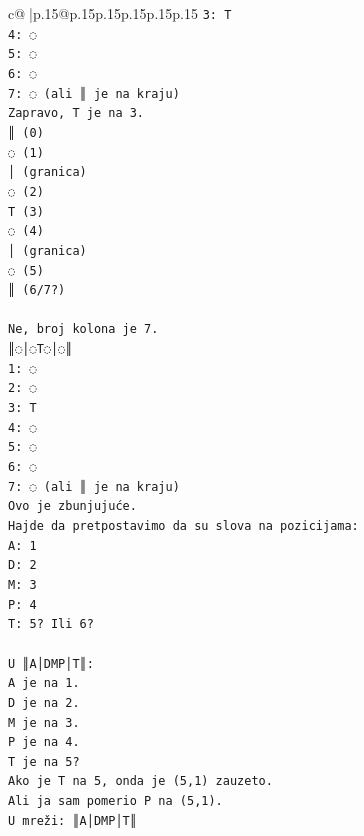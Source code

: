\documentclass{article}
\begin{document}
{\begin{supertabular}{c@{$\;$}|p{.15\linewidth}@{}p{.15\linewidth}p{.15\linewidth}p{.15\linewidth}p{.15\linewidth}p{.15\linewidth}}
{{{\texttt{3: T} \\
\texttt{4: ◌} \\
\texttt{5: ◌} \\
\texttt{6: ◌} \\
\texttt{7: ◌ (ali ║ je na kraju)} \\
\texttt{Zapravo, T je na 3.} \\
\texttt{║ (0)} \\
\texttt{◌ (1)} \\
\texttt{│ (granica)} \\
\texttt{◌ (2)} \\
\texttt{T (3)} \\
\texttt{◌ (4)} \\
\texttt{│ (granica)} \\
\texttt{◌ (5)} \\
\texttt{║ (6/7?)} \\
\\ 
\texttt{Ne, broj kolona je 7.} \\
\texttt{║◌│◌T◌│◌║} \\
\texttt{1: ◌} \\
\texttt{2: ◌} \\
\texttt{3: T} \\
\texttt{4: ◌} \\
\texttt{5: ◌} \\
\texttt{6: ◌} \\
\texttt{7: ◌ (ali ║ je na kraju)} \\
\texttt{Ovo je zbunjujuće.} \\
\texttt{Hajde da pretpostavimo da su slova na pozicijama:} \\
\texttt{A: 1} \\
\texttt{D: 2} \\
\texttt{M: 3} \\
\texttt{P: 4} \\
\texttt{T: 5? Ili 6?} \\
\\ 
\texttt{U ║A│DMP│T║:} \\
\texttt{A je na 1.} \\
\texttt{D je na 2.} \\
\texttt{M je na 3.} \\
\texttt{P je na 4.} \\
\texttt{T je na 5?} \\
\texttt{Ako je T na 5, onda je (5,1) zauzeto.} \\
\texttt{Ali ja sam pomerio P na (5,1).} \\
\texttt{U mreži: ║A│DMP│T║} \\
}}}
\end{supertabular}}
\end{document}
